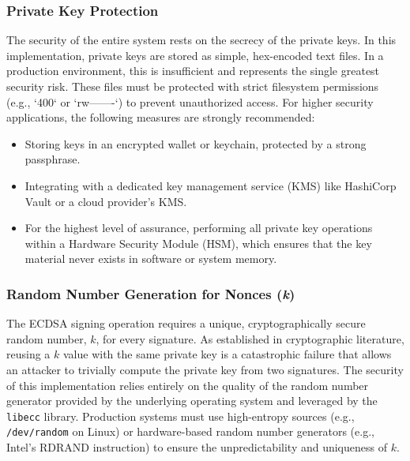 \documentclass[12pt, letterpaper]{article}
\begin{document}
\subsubsection{Private Key Protection}
The security of the entire system rests on the secrecy of the private keys. In this implementation, private keys are stored as simple, hex-encoded text files. In a production environment, this is insufficient and represents the single greatest security risk. These files must be protected with strict filesystem permissions (e.g., `400` or `rw-------`) to prevent unauthorized access. For higher security applications, the following measures are strongly recommended:
\begin{itemize}
	\item Storing keys in an encrypted wallet or keychain, protected by a strong passphrase.
	\item Integrating with a dedicated key management service (KMS) like HashiCorp Vault or a cloud provider's KMS.
	\item For the highest level of assurance, performing all private key operations within a Hardware Security Module (HSM), which ensures that the key material never exists in software or system memory.
\end{itemize}

\subsubsection{Random Number Generation for Nonces (\textit{k})}
The ECDSA signing operation requires a unique, cryptographically secure random number, $k$, for every signature. As established in cryptographic literature, reusing a $k$ value with the same private key is a catastrophic failure that allows an attacker to trivially compute the private key from two signatures. The security of this implementation relies entirely on the quality of the random number generator provided by the underlying operating system and leveraged by the \texttt{libecc} library. Production systems must use high-entropy sources (e.g., \texttt{/dev/random} on Linux) or hardware-based random number generators (e.g., Intel's RDRAND instruction) to ensure the unpredictability and uniqueness of $k$.
\end{document}

